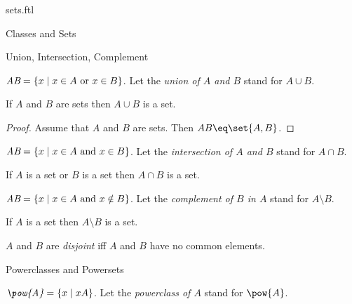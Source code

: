 \documentclass{naproche-library}
\begin{document}
\begin{smodule}{sets.ftl}
\begin{sfragment}{Classes and Sets}
  \begin{sfragment}{Union, Intersection, Complement}
  \begin{definition*}[forthel,id=UnionDef]
      $\emph{A\cup B}=\{x\mid x\in A\text{ or }x\in B\}$.
      Let the \emph{union of $A$ and $B$} stand for $A\cup B$.
    \end{definition*}

    \begin{forthel}
      \begin{proposition*}[id=UnionProp]
        If $A$ and $B$ are sets then $A\cup B$ is a set.
      \end{proposition*}
      \begin{proof}
        Assume that $A$ and $B$ are sets.
        Then $A\cup B\eq \bigcup\set{A,B}$.
      \end{proof}
    \end{forthel}

    \begin{definition*}[forthel,id=IntersectionDef]
      $\emph{A\cap B}=\{x\mid x\in A\text{ and }x\in B\}$.
      Let the \emph{intersection of $A$ and $B$} stand for $A\cap B$.
    \end{definition*}

    \begin{proposition*}[forthel,id=IntersectionProp]
      If $A$ is a set or $B$ is a set then $A\cap B$ is a set.
    \end{proposition*}

    \begin{definition*}[forthel,id=ComplementDef]
      $\emph{A\setminus B}=\{x\mid x\in A\text{ and }x\notin B\}$.
      Let the \emph{complement of $B$ in $A$} stand for $A\setminus B$.
    \end{definition*}

    \begin{proposition*}[forthel,id=ComplementProp]
      If $A$ is a set then $A\setminus B$ is a set.
    \end{proposition*}

    \begin{definition*}[forthel,id=DisjointDef]
      $A$ and $B$ are \emph{disjoint} iff $A$ and $B$ have no common elements.
    \end{definition*}
  \end{sfragment}

  \begin{sfragment}{Powerclasses and Powersets}
    \begin{definition*}[forthel,id=PowerclassDef]
      $\emph{\pow{A}}=\{x\mid x\subseteq A\}$.
      Let the \emph{powerclass of $A$} stand for $\pow{A}$.
    \end{definition*}


\end{sfragment}
\end{sfragment}
\end{smodule}
\end{document}
